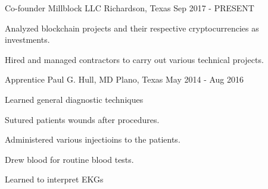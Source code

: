 \begin{cventries}
	\cventry
	{Co-founder} %
	{Millblock LLC} %
	{Richardson, Texas} %
	{Sep 2017 - PRESENT} %
	{
		\begin{cvitems} %
			\item {Analyzed blockchain projects and their respective cryptocurrencies as investments.}
			\item {Hired and managed contractors to carry out various technical projects.}
		\end{cvitems}
	}

	\cventry
	{Apprentice} %
	{Paul G. Hull, MD} %
	{Plano, Texas} %
	{May 2014 - Aug 2016} %
	{
		\begin{cvitems} %
			\item {Learned general diagnostic techniques}
			\item {Sutured patients wounds after procedures.}
			\item {Administered various injectioins to the patients.}
			\item {Drew blood for routine blood tests.}
			\item {Learned to interpret EKGs}
		\end{cvitems}
	}

\end{cventries}
